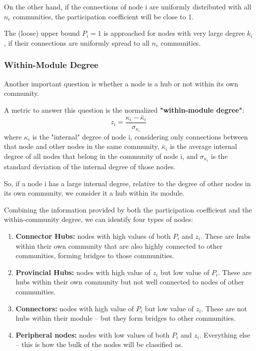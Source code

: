 \documentclass[11pt]{scrartcl} %
\begin{document}
On the other hand, if the connections of node i are uniformly distributed with all $n_c$ communities, the participation coefficient will be close to 1.

The (loose) upper bound $P_i=1$ is approached for nodes with very large degree $k_i$, if their connections are uniformly spread to all $n_c$ communities.

\subsubsection{Within-Module Degree}
Another important question is whether a node is a hub or not within its own community.

A metric to answer this question is the normalized \textbf{"within-module degree"}:
\[ z_i = \frac{\kappa_i - \bar{\kappa}_{i}}{\sigma_{\kappa_i}} \]
where $\kappa_i$ is the "internal" degree of node i, considering only connections between that node and other nodes in the same community, $\bar{\kappa}_i$  is the average internal degree of all nodes that belong in the community of node i, and $\sigma_{\kappa_i}$ is the standard deviation of the internal degree of those nodes.

So, if a node i has a large internal degree, relative to the degree of other nodes in its own community, we consider it a  hub within its module.

Combining the information provided by both the participation coefficient and the within-community degree, we can identify four types of nodes:
\begin{enumerate}
	\item \textbf{Connector Hubs:} nodes with high values of both $P_i$ and $z_i$. These are hubs within their own community that are also highly connected to other communities, forming bridges to those communities.
	\item \textbf{Provincial Hubs:} nodes with high value of $z_i$ but low value of $P_i$. These are hubs within their own community but not well connected to nodes of other communities.
	\item \textbf{Connectors:} nodes with high value of $P_i$ but low value of $z_i$. These are not hubs within their module – but they form bridges to other communities.
	\item \textbf{Peripheral nodes:} nodes with low values of both $P_i$ and $z_i$. Everything else -- this is how the bulk of the nodes will be classified as. 
\end{enumerate}
\end{document}
